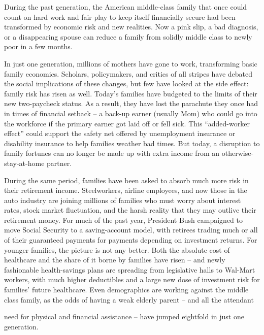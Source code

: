 \documentclass[a4paper]{article}
\begin{document}
\par
During the past generation, the American middle-class family that once could count on hard work and fair play to keep itself financially secure had been transformed by economic risk and new realities. Now a pink slip, a bad diagnosis, or a disappearing spouse can reduce a family from solidly middle class to newly poor in a few months.

\par
In just one generation, millions of mothers have gone to work, transforming basic family economics. Scholars, policymakers, and critics of all stripes have debated the social implications of these changes, but few have looked at the side effect: family risk has risen as well. Today’s families have budgeted to the limits of their new two-paycheck status. As a result, they have lost the parachute they once had in times of financial setback – a back-up earner (usually Mom) who could go into the workforce if the primary earner got laid off or fell sick. This “added-worker effect” could support the safety net offered by unemployment insurance or disability insurance to help families weather bad times. But today, a disruption to family fortunes can no longer be made up with extra income from an otherwise-stay-at-home partner.

\par
During the same period, families have been asked to absorb much more risk in their retirement income. Steelworkers, airline employees, and now those in the auto industry are joining millions of families who must worry about interest rates, stock market fluctuation, and the harsh reality that they may outlive their retirement money. For much of the past year, President Bush campaigned to move Social Security to a saving-account model, with retirees trading much or all of their guaranteed payments for payments depending on investment returns. For younger families, the picture is not any better. Both the absolute cost of healthcare and the share of it borne by families have risen – and newly fashionable health-savings plans are spreading from legislative halls to Wal-Mart workers, with much higher deductibles and a large new dose of investment risk for families’ future healthcare. Even demographics are working against the middle class family, as the odds of having a weak elderly parent – and all the attendant

\par
need for physical and financial assistance – have jumped eightfold in just one generation.
\end{document}
